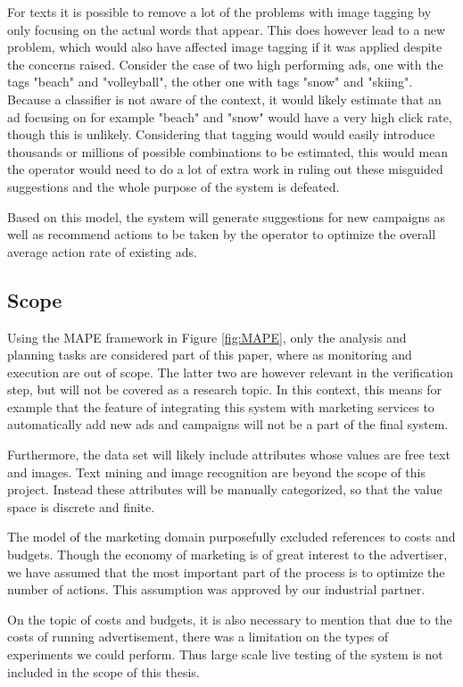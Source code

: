 \documentclass{sig-alternate}
\begin{document}
For texts it is possible to remove a lot of the problems with image tagging by only focusing on the actual words that appear. This does however lead to a new problem, which would also have affected image tagging if it was applied despite the concerns raised. Consider the case of two high performing ads, one with the tags "beach" and "volleyball", the other one with tags "snow" and "skiing". Because a classifier is not aware of the context, it would likely estimate that an ad focusing on for example "beach" and "snow" would have a very high click rate, though this is unlikely. Considering that tagging would would easily introduce thousands or millions of possible combinations to be estimated, this would mean the operator would need to do a lot of extra work in ruling out these misguided suggestions and the whole purpose of the system is defeated.

Based on this model, the system will generate suggestions for new campaigns as well as recommend actions to be taken by the operator to optimize the overall average action rate of existing ads.

\subsection{Scope}
Using the MAPE framework in Figure \ref{fig:MAPE}, only the analysis and planning tasks are considered part of this paper, where as monitoring and execution are out of scope. The latter two are however relevant in the verification step, but will not be covered as a research topic. In this context, this means for example that the feature of integrating this system with marketing services to automatically add new ads and campaigns will not be a part of the final system.

Furthermore, the data set will likely include attributes whose values are free text and images. Text mining and image recognition are beyond the scope of this project. Instead these attributes will be manually categorized, so that the value space is discrete and finite.

The model of the marketing domain purposefully excluded references to costs and budgets. Though the economy of marketing is of great interest to the advertiser, we have assumed that the most important part of the process is to optimize the number of actions. This assumption was approved by our industrial partner.

On the topic of costs and budgets, it is also necessary to mention that due to the costs of running advertisement, there was a limitation on the types of experiments we could perform. Thus large scale live testing of the system is not included in the scope of this thesis.
\end{document}
